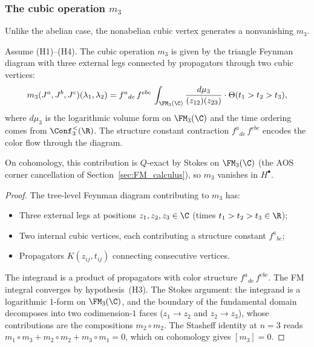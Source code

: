 \subsubsection{The cubic operation $m_3$}

Unlike the abelian case, the nonabelian cubic vertex generates a
nonvanishing $m_3$.

\begin{proposition}[Nonabelian $m_3$]
Assume \textrm{(H1)--(H4)}. The cubic operation $m_3$ is given
by the triangle Feynman diagram with three external legs
connected by propagators through two cubic vertices:
\begin{equation}%
m_3(J^a, J^b, J^c)(\lambda_1, \lambda_2)
= f^{a}{}_{de}\, f^{ebc}\,
 \int_{\FM_3(\C)} \frac{d\mu_3}{(z_{12})(z_{23})}
 \cdot \Theta(t_1 > t_2 > t_3),
\end{equation}
where $d\mu_3$ is the logarithmic volume form on $\FM_3(\C)$
and the time ordering comes from $\Conf_3^{<}(\R)$.
The structure constant contraction
$f^{a}{}_{de}\, f^{ebc}$ encodes the color flow through the
diagram.

On cohomology, this contribution is $Q$-exact by Stokes on
$\FM_3(\C)$ (the AOS corner cancellation of
Section~\ref{sec:FM_calculus}), so $m_3$ vanishes in $H^\bullet$.
\end{proposition}

\begin{proof}
The tree-level Feynman diagram contributing to $m_3$ has:
\begin{itemize}
\item Three external legs at positions $z_1, z_2, z_3 \in \C$
 (times $t_1 > t_2 > t_3 \in \R$);
\item Two internal cubic vertices, each contributing a structure
 constant $f^a{}_{bc}$;
\item Propagators $K(z_{ij}, t_{ij})$ connecting consecutive
 vertices.
\end{itemize}
The integrand is a product of propagators with color structure
$f^{a}{}_{de}\, f^{ebc}$. The FM integral converges by
hypothesis~(H3). The Stokes argument: the integrand is a
logarithmic $1$-form on $\FM_3(\C)$, and the boundary of the
fundamental domain decomposes into two codimension-$1$ faces
($z_1 \to z_2$ and $z_2 \to z_3$), whose contributions are the
compositions $m_2 \circ m_2$. The Stasheff identity at $n=3$
reads $m_1 \circ m_3 + m_2 \circ m_2 + m_3 \circ m_1 = 0$,
which on cohomology gives $[m_3] = 0$.
\end{proof}

